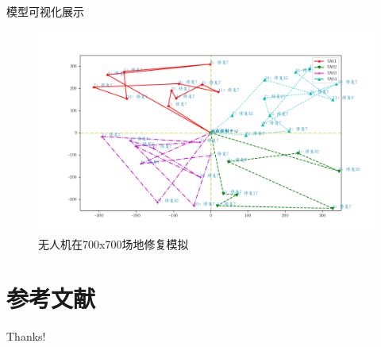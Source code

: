 \documentclass{beamer}
\begin{document}
\begin{frame}{模型可视化展示}

    \begin{figure}[htbp]
        \centering
        \includegraphics[scale=0.4]{pic/test2.png}
        \caption{无人机在700x700场地修复模拟}
    \end{figure}
\end{frame}

\section{参考文献}

\begin{frame}[allowframebreaks]
    
    
\end{frame}

\begin{frame}
    \begin{center}
        {\Huge\calligra Thanks!}
    \end{center}
\end{frame}
\end{document}

